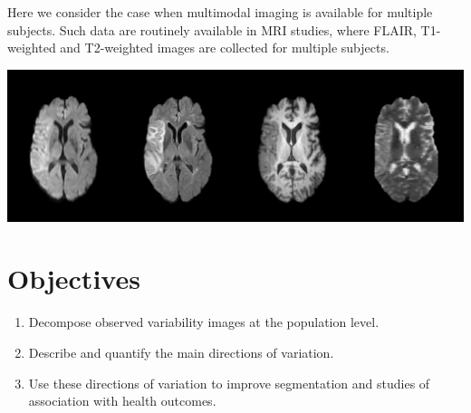 \documentclass[a0,landscape]{a0poster}
\begin{document}
\begin{multicols}{3}
\noindent Here we consider the case when multimodal imaging is available for multiple subjects. Such data are routinely available in MRI studies, where FLAIR, T1-weighted and T2-weighted images are collected for multiple subjects.
\begin{center}\vspace{.5cm}
\includegraphics[width=1\linewidth]{image_ex.pdf}
\end{center}\vspace{.5cm}
\large{\section*{\color{uwred}Objectives}}
\begin{enumerate}
\item  Decompose observed variability images at the population level.
\item Describe and quantify the main directions of variation.
\item Use these directions of variation to improve segmentation and studies of association with health outcomes.
\end{enumerate}


\end{multicols}
\end{document}
